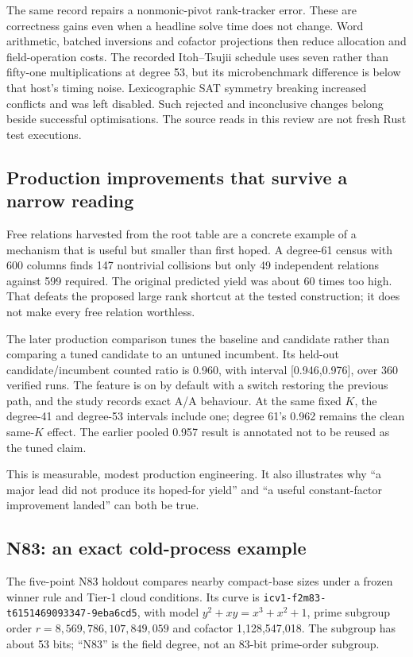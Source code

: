 The same record repairs a nonmonic-pivot rank-tracker error. These are
correctness gains even when a headline solve time does not change.
Word arithmetic, batched inversions and cofactor projections then reduce
allocation and field-operation costs. The recorded Itoh--Tsujii schedule
uses seven rather than fifty-one multiplications at degree 53, but its
microbenchmark difference is below that host's timing noise. Lexicographic
SAT symmetry breaking increased conflicts and was left disabled. Such
rejected and inconclusive changes belong beside successful optimisations.
The source reads in this review are not fresh Rust test executions.

\subsection{Production improvements that survive a narrow reading}

Free relations harvested from the root table are a concrete example of a
mechanism that is useful but smaller than first hoped. A degree-61 census
with 600 columns finds 147 nontrivial collisions but only 49 independent
relations against 599 required. The original predicted yield was about
60 times too high. That defeats the proposed large rank shortcut at the
tested construction; it does not make every free relation worthless.

The later production comparison tunes the baseline and candidate rather
than comparing a tuned candidate to an untuned incumbent. Its held-out
candidate/incumbent counted ratio is 0.960, with interval
[0.946,0.976], over 360 verified runs. The feature is on by default with
a switch restoring the previous path, and the study records exact A/A
behaviour. At the same fixed $K$, the degree-41 and degree-53 intervals
include one; degree 61's 0.962 remains the clean same-$K$ effect. The
earlier pooled 0.957 result is annotated not to be reused as the tuned
claim.

This is measurable, modest production engineering. It also illustrates
why ``a major lead did not produce its hoped-for yield'' and ``a useful
constant-factor improvement landed'' can both be true.

\subsection{N83: an exact cold-process example}

The five-point N83 holdout compares nearby compact-base sizes under a
frozen winner rule and Tier-1 cloud conditions. Its curve is
\texttt{icv1-f2m83-t6151469093347-9eba6cd5}, with model
$y^2+xy=x^3+x^2+1$, prime subgroup order
$r=8,569,786,107,849,059$ and cofactor 1,128,547,018.
The subgroup has about 53 bits; ``N83'' is the field degree, not an
83-bit prime-order subgroup.

